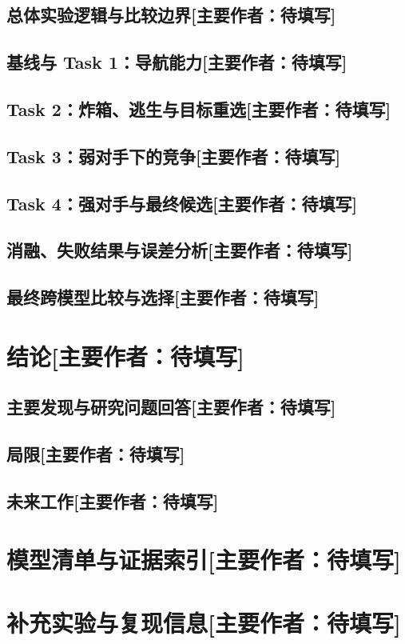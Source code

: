 \documentclass[UTF8,11pt,a4paper,fontset=none]{ctexart}
\newcommand{\primaryauthor}[1]{\texorpdfstring{\enspace\normalfont\small[主要作者：#1]}{ [主要作者：#1]}}
\newcommand{\authorsection}[2]{\section{#1\primaryauthor{#2}}}
\newcommand{\authorsubsection}[2]{\subsection{#1\primaryauthor{#2}}}
\newcommand{\pendingauthor}{待填写}
\newif\ifdraftguidance
\newcommand{\writingnote}[1]{%
  \ifdraftguidance
    \par\noindent\begingroup\color{promptblue}\small
    \fbox{\begin{minipage}{0.94\linewidth}\textbf{写作提示：}#1\end{minipage}}%
    \par\endgroup
  \fi
}
\newcommand{\todoitem}[1]{%
  \ifdraftguidance\textcolor{promptblue}{\textbf{[待补：#1]}}\fi
}
\begin{document}
\authorsubsection{总体实验逻辑与比较边界}{\pendingauthor}
\writingnote{说明哪些实验可直接比较，哪些因场景、对手、seed、checkpoint 或统计单位不同只能诊断。训练 seed 和同一模型的环境重复不能混为独立训练。}
\todoitem{正文}

\authorsubsection{基线与 Task 1：导航能力}{\pendingauthor}
\writingnote{比较课程基线和各学习模型。报告金币、全收集率、步数、非法动作、WAIT/循环及不确定性；说明晋级决定。}
\todoitem{协议、表/图、结果解释与决定}

\authorsubsection{Task 2：炸箱、逃生与目标重选}{\pendingauthor}
\writingnote{报告金币、炸箱、炸弹存活、自杀、全收集、停滞和旧任务保持。把安全改善与长期规划改善分开讨论。}
\todoitem{协议、表/图、结果解释与决定}

\authorsubsection{Task 3：弱对手下的竞争}{\pendingauthor}
\writingnote{报告得分、金币、击杀、名次、生存及旧任务回归。若比较父子 checkpoint，优先在相同世界/seed 上做配对分析。}
\todoitem{协议、表/图、结果解释与决定}

\authorsubsection{Task 4：强对手与最终候选}{\pendingauthor}
\writingnote{区分开发筛选、独立确认、历史 benchmark 和专项测试。报告策略稳定性、失败模式和计算成本；不要把不同协议合并成统一排行榜。}
\todoitem{协议、表/图、结果解释与决定}

\authorsubsection{消融、失败结果与误差分析}{\pendingauthor}
\writingnote{至少覆盖关键特征、奖励、安全机制或训练技巧的对照。展示代表性失败轨迹，并判断瓶颈来自表示、奖励、学习、动作过滤还是评估。}
\todoitem{消融表、失败案例与解释}

\authorsubsection{最终跨模型比较与选择}{\pendingauthor}
\writingnote{在完全一致的场景、对手、seed、局数和冻结条件下比较最终候选与课程基线。说明主指标、置信区间、旧任务保持、CPU 完整 act 延迟、内存、超时和打包等价性。}
\todoitem{最终比较表与选择依据}

\authorsection{结论}{\pendingauthor}
\writingnote{总结发现并直接回答研究问题；解释最终选择的证据与适用边界。不要在结论引入新实验。}

\authorsubsection{主要发现与研究问题回答}{\pendingauthor}
\writingnote{逐条对应引言中的研究问题，给出最关键的定量证据和最终模型选择。}
\todoitem{正文}

\authorsubsection{局限}{\pendingauthor}
\writingnote{讨论样本量、训练 seed、协议缺口、计算资源、未覆盖对手、测量范围、语言/篇幅确认和无法证明的安全性质。}
\todoitem{正文}

\authorsubsection{未来工作}{\pendingauthor}
\writingnote{说明如果有更多时间，最值得执行的 Agent 改进、实验和游戏设置变化；把建议与已观察失败对应起来。}
\todoitem{正文}




\appendix
\authorsection{模型清单与证据索引}{\pendingauthor}
\writingnote{列出所有开发模型、配置、checkpoint、哈希、训练终点、证据状态和路径。附录不能替代正文中的核心方法与结果。}
\todoitem{清单表}

\authorsection{补充实验与复现信息}{\pendingauthor}
\writingnote{放置正文容纳不下但复现所需的命令、完整超参数、额外结果、数据契约和打包检查。注意最终公开仓库不能包含报告本身。}
\todoitem{补充内容}
\end{document}
